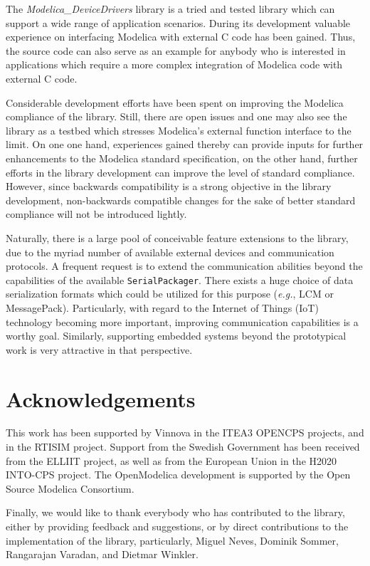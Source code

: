 \documentclass{resources/modelica}
\newcommand{\modelica}[1]{\lstinline[language=modelica]|#1|}
\begin{document}
The \emph{Modelica\_DeviceDrivers} library is a tried and tested library which
can support a wide range of application scenarios. During its development
valuable experience on interfacing Modelica with external C code has been
gained. Thus, the source code can also serve as an example for anybody who is
interested in applications which require a more complex integration of Modelica
code with external C code.

Considerable development efforts have been spent on improving the Modelica
compliance of the library. Still, there are open issues and one may also see the
library as a testbed which stresses Modelica's external function interface
to the limit. On one one hand, experiences gained thereby can provide inputs for
further enhancements to the Modelica standard specification, on the other hand,
further efforts in the library development can improve the level of standard compliance.
However, since backwards compatibility is a strong objective in the library
development, non-backwards compatible changes for the sake of better
standard compliance will not be introduced lightly.

Naturally, there is a large pool of conceivable feature extensions to the
library, due to the myriad number of available external devices and
communication protocols. A frequent request is to extend the communication
abilities beyond the capabilities of the available \mbox{\modelica{SerialPackager}.}
There exists a huge choice of data serialization formats which could be utilized for this
purpose (\textit{e.g.}, LCM or MessagePack). Particularly, with regard to the Internet of Things (IoT) technology
becoming more important, improving communication capabilities is a worthy goal.
Similarly, supporting embedded systems beyond the prototypical work is very attractive in that perspective.

\section*{Acknowledgements}

This work has been supported by Vinnova in the ITEA3 OPENCPS projects,
and in the RTISIM project.
Support from the Swedish Government has been received from the ELLIIT project,
as well as from the European Union in the H2020 INTO-CPS project.
The OpenModelica development is supported by the Open Source Modelica Consortium.

Finally, we would like to thank everybody who has contributed to the library,
either by providing feedback and suggestions, or by direct contributions to
the implementation of the library, particularly, Miguel Neves, Dominik Sommer,
Rangarajan Varadan, and Dietmar Winkler.



\end{document}
